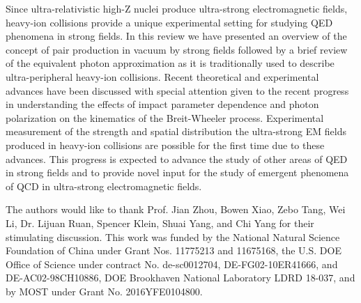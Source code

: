 \documentclass[12pt,epjc3]{svjour3}\sloppy
\begin{document}
Since ultra-relativistic high-Z nuclei produce ultra-strong electromagnetic fields, heavy-ion collisions provide a unique experimental setting for studying QED phenomena in strong fields. In this review we have presented an overview of the concept of pair production in vacuum by strong fields followed by a brief review of the equivalent photon approximation as it is traditionally used to describe ultra-peripheral heavy-ion collisions. Recent theoretical and experimental advances have been discussed with special attention given to the recent progress in understanding the effects of impact parameter dependence and photon polarization on the kinematics of the Breit-Wheeler process. Experimental measurement of the strength and spatial distribution the ultra-strong EM fields produced in heavy-ion collisions are possible for the first time due to these advances. This progress is expected to advance the study of other areas of QED in strong fields and to provide novel input for the study of emergent phenomena of QCD in ultra-strong electromagnetic fields.  



\begin{acknowledgements}
The authors would like to thank Prof. Jian Zhou, Bowen Xiao, Zebo Tang, Wei Li, Dr. Lijuan Ruan, Spencer Klein, Shuai Yang, and Chi Yang for their stimulating discussion. 
This work was funded by the National Natural Science Foundation of China
under Grant Nos. 11775213 and 11675168, 
the U.S. DOE Office of Science under contract No. de-sc0012704, DE-FG02-10ER41666, and DE-AC02-98CH10886, 
DOE Brookhaven National Laboratory LDRD 18-037, and by MOST under Grant No. 2016YFE0104800.
\end{acknowledgements}



\end{document}
